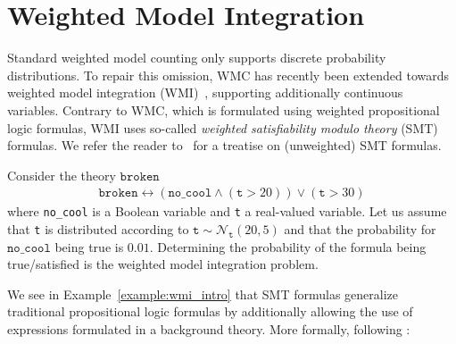 
\section{Weighted Model Integration}
\label{app:wmi}

Standard weighted model counting only supports discrete probability distributions. To repair this omission, WMC has recently been extended towards weighted model integration (WMI)~\citep{belle2015probabilistic}, supporting additionally continuous variables. Contrary to WMC, which is formulated using weighted propositional logic formulas, WMI uses so-called {\em weighted  satisfiability modulo theory} (SMT) formulas. We refer the reader to~\citep{barrett2009handbook} for a treatise on (unweighted) SMT formulas.

\begin{example}\label{example:wmi_intro}
    Consider the theory $\mathtt{broken}$
	\begin{align}
	\textstyle{\texttt{broken} \leftrightarrow ( \texttt{no\_cool} \land (\texttt{t}> 20) )  \lor (\texttt{t}> 30)} \label{eqn:broken}
	\end{align}
	where \texttt{no\_cool} is a Boolean variable and \texttt{t} a real-valued variable.
    Let us assume that \texttt{t} is distributed  according to $\texttt{t} \sim \mathcal{N}_\texttt{t}(20,5)$ and that the probability for $\texttt{no\_cool}$ being true is $0.01$. Determining the probability of the formula being true/satisfied is the weighted model integration problem.
\end{example}


We see in Example~\ref{example:wmi_intro} that SMT formulas generalize traditional propositional logic formulas by additionally allowing the use of expressions formulated in a background theory. More formally, following \cite{zuidbergdosmartires2019exact}:

